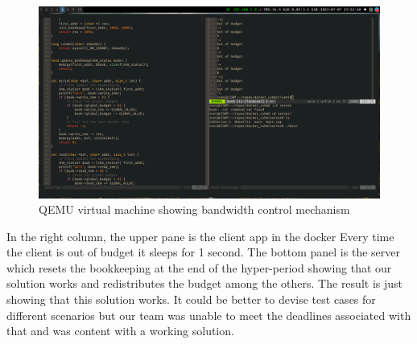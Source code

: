 \documentclass[a4paper, 10pt]{article}
\theoremstyle{nonumberplain}
\begin{document}
\begin{figure}[H]
    \centering
    \includegraphics[scale=0.2]{results.png}
    \caption{QEMU virtual machine showing bandwidth control mechanism}
\end{figure}

In the right column, the upper pane is the client app in the docker
Every time the client is out of budget it sleeps for 1 second.
The bottom panel is the server which resets the bookkeeping at the end of the
hyper-period showing that our solution works and redistributes the budget among
the others. The result is just showing that this solution works. It could be
better to devise test cases for different scenarios but our team was unable
to meet the deadlines associated with that and was content with a working
solution.
\end{document}
